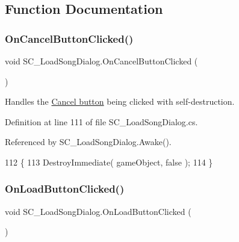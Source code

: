 \subsection{Function Documentation}
\mbox{\label{group___s_c___l_s_d_handlers_gae393a24bbdd4fa1d2b45fa4199fb453a}} 
\subsubsection{\texorpdfstring{On\+Cancel\+Button\+Clicked()}{OnCancelButtonClicked()}}
{\footnotesize\ttfamily void S\+C\+\_\+\+Load\+Song\+Dialog.\+On\+Cancel\+Button\+Clicked (\begin{DoxyParamCaption}{ }\end{DoxyParamCaption})\hspace{0.3cm}{\ttfamily [private]}}



Handles the \hyperlink{group___s_c___l_s_d_priv_var_ga31e17d7ca1cb32f0ad75ef8c7235873f}{Cancel button} being clicked with self-\/destruction. 



Definition at line 111 of file S\+C\+\_\+\+Load\+Song\+Dialog.\+cs.



Referenced by S\+C\+\_\+\+Load\+Song\+Dialog.\+Awake().


\begin{DoxyCode}
112     \{
113         DestroyImmediate( gameObject, \textcolor{keyword}{false} );
114     \}
\end{DoxyCode}
\mbox{\label{group___s_c___l_s_d_handlers_gad6ab852f2ac019395482e8c836061639}} 
\subsubsection{\texorpdfstring{On\+Load\+Button\+Clicked()}{OnLoadButtonClicked()}}
{\footnotesize\ttfamily void S\+C\+\_\+\+Load\+Song\+Dialog.\+On\+Load\+Button\+Clicked (\begin{DoxyParamCaption}{ }\end{DoxyParamCaption})\hspace{0.3cm}{\ttfamily [private]}}



